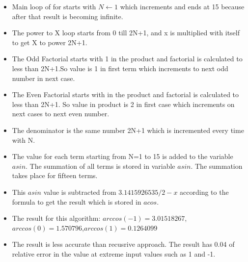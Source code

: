 \documentclass[12pt]{article}
\begin{document}
\begin{itemize}
    \item Main loop of for starts with $N \gets 1$ which increments and ends at 15 because after that result is becoming infinite.
    \item The power to X loop starts from 0 till 2N+1, and x is multiplied with itself to get X to power 2N+1.
    \item The Odd Factorial starts with 1 in the product and factorial is calculated to less than 2N+1.So value is 1 in first term which increments to next odd number in next case.
    \item The Even Factorial starts with in the product and factorial is calculated to less than 2N+1. So value in product is 2 in first case which increments on next cases to next even number.
    \item The denominator is the same number 2N+1 which is incremented every time with N.
    \item The value for each term starting from N=1 to 15 is added to the variable $asin$. The summation of all terms is stored in variable $asin$. The summation takes place for fifteen terms. 
    \item This $asin$ value is subtracted from $3.1415926535/2 - x$ according to the formula to get the result which is stored in $acos$.
    \item The result for this algorithm: $arccos(-1)=3.01518267$,$arccos(0)=1.570796$,$arccos(1)=0.1264099$
    \item The result is less accurate than recusrive approach. The result has 0.04 of relative error in the value at extreme input values such as 1 and -1.
\end{itemize}
\end{document}
